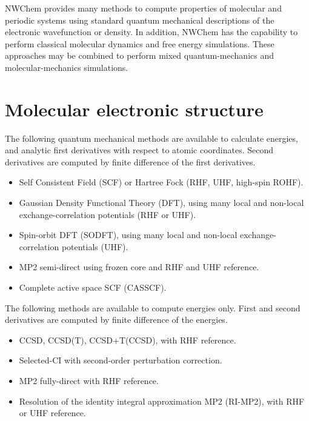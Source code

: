 \label{sec:functionality}

NWChem provides many methods to compute properties of molecular and
periodic systems using standard quantum mechanical descriptions of the
electronic wavefunction or density.  In addition, NWChem has the
capability to perform classical molecular dynamics and free energy
simulations.  These approaches may be combined to perform mixed
quantum-mechanics and molecular-mechanics simulations. 

\section{Molecular electronic structure}

The following quantum mechanical methods are available to calculate
energies, and analytic first derivatives with respect to atomic
coordinates.  Second derivatives are computed by finite difference of
the first derivatives.

\begin{itemize}
\item Self Consistent Field (SCF) or Hartree Fock (RHF, UHF, high-spin
  ROHF).  
\item Gaussian Density Functional Theory (DFT), using many local and
  non-local exchange-correlation potentials (RHF or UHF).
\item Spin-orbit DFT (SODFT), using many local and non-local
  exchange-correlation potentials (UHF).
\item MP2 semi-direct using frozen core and RHF and UHF reference.
\item Complete active space SCF (CASSCF).

\end{itemize}

The following methods are available to compute energies only.  First
and second derivatives are computed by finite difference of the
energies.
\begin{itemize}
\item CCSD, CCSD(T), CCSD+T(CCSD), with RHF reference.
\item Selected-CI with second-order perturbation correction.
\item MP2 fully-direct with RHF reference.
\item Resolution of the identity integral approximation MP2 (RI-MP2), with
  RHF or UHF reference.
\end{itemize}

